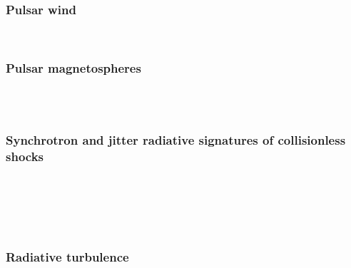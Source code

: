 \documentclass[usenatbib,twocolumn]{aastex63}
\begin{document}
\subsubsection{Pulsar wind}
\citep{Cerutti_2017} \\

\subsubsection{Pulsar magnetospheres}
\citep{Cerutti_2016a} \\
\citep{Philippov_2018} \\


\subsubsection{Synchrotron and jitter radiative signatures of collisionless shocks}
\citep{Medvedev_2009} \\
\citep{Sironi_2009} \\
\citep{Kirk_2010} \\
\citep{Nishikawa_2011} \\

\subsubsection{Radiative turbulence}
\citep{Zhdankin_2019}








\end{document}

